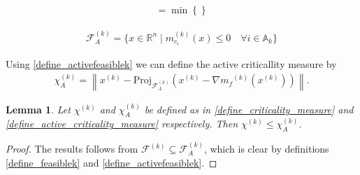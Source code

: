 \documentclass{article}
\newtheorem{lemma}[theorem]{Lemma}
\theoremstyle{case}
\numberwithin{theorem}{subsection}
\newcommand{\activeconstraintsk}{{\mathbb A_{k}}}
\newcommand{\chik}{{\chi^{(k)}}}
\newcommand{\feasiblek}{{\mathcal F^{(k)}}}
\newcommand{\mcik}{{{m}^{(k)}_{c_i}}}
\newcommand{\mfk}{{{m}_f}^{(k)}}
\newcommand{\Rn}{\mathbb R^n}
\newcommand{\xk}{x^{(k)}}
\newcommand{\activefeasiblek}{{\mathcal F^{(k)}_A}}
\newcommand{\activechik}{{\chi_A^{(k)}}}
\begin{document}
\begin{align*}
 = \min\left\{\right\}
\end{align*}
\color{black}



\begin{align}
\activefeasiblek = \{x \in \Rn \; | \; \mcik(x) \le 0 \quad \forall i \in \activeconstraintsk \} \label{define_activefeasiblek}
\end{align}

Using \cref{define_activefeasiblek} we can define the active criticallity measure by
\begin{align}
\activechik = \left\|\xk - \text{Proj}_{\activefeasiblek}\left(\xk- \nabla \mfk\left(\xk\right)\right)\right\| \label{define_active_criticality_measure}.
\end{align}


\begin{lemma}
Let $\chik$ and $\activechik$ be defined as in \cref{define_criticality_measure} and \cref{define_active_criticality_measure} respectively.
Then $\chik \le \activechik$.
\end{lemma}
\begin{proof}
The results follows from $\feasiblek \subseteq \activefeasiblek$, which is clear by definitions \cref{define_feasiblek} and \cref{define_activefeasiblek}.
\end{proof}
\end{document}

